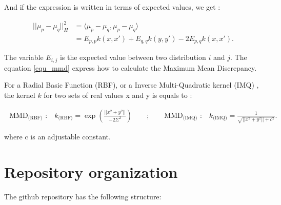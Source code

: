 \documentclass[11pt, english]{article}
\begin{document}
And if the expression is written in terms of expected values, we get :

\begin{align}
|| \mu_p - \mu_q||^2_H  &= \langle \mu_p - \mu_q, \mu_p - \mu_q \rangle \\
&= E_{p,p}k(x,x') + E_{q,q}k(y,y') - 2E_{p,q}k(x,x') .
\label{equ_mmd}
\end{align}

The variable $E_{i,j}$ is the expected value between two distribution $i$ and $j$.
The equation \ref{equ_mmd} express how to calculate the Maximum Mean Discrepancy.

For a Radial Basic Function (RBF), or a Inverse Multi-Quadratic kernel (IMQ) \cite{ref_MMD_2}, the kernel $k$ for two sets of real values x and y is equals to :

\begin{align}
\text{ MMD$_{\text{(RBF)}}$ :} \quad
    k_{\text{(RBF)}} = \exp \left( \frac{ ||x^2 + y^2||}{- 2 \Sigma^2} \right) \qquad; \qquad
\text{MMD$_{\text{(IMQ)}}$ :} \quad
    k_{\text{(IMQ)}} = \frac{ 1 }{ \sqrt{ ||x^2 + y^2|| + c^2} }. \qquad
\end{align}

 where c is an adjustable constant.
\newpage
\section{Repository organization}

The github repository has the following structure:\newline
\end{document}
